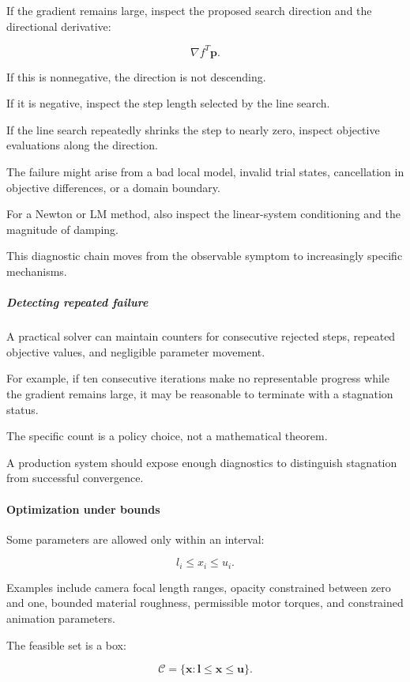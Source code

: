 If the gradient remains large, inspect the proposed search direction and the directional derivative:

\[
\nabla f^T\mathbf p.
\]

If this is nonnegative, the direction is not descending.

If it is negative, inspect the step length selected by the line search.

If the line search repeatedly shrinks the step to nearly zero, inspect objective evaluations along the direction.

The failure might arise from a bad local model, invalid trial states, cancellation in objective differences, or a domain boundary.

For a Newton or LM method, also inspect the linear-system conditioning and the magnitude of damping.

This diagnostic chain moves from the observable symptom to increasingly specific mechanisms.

\subparagraph{Detecting repeated failure}\label{detecting-repeated-failure}

A practical solver can maintain counters for consecutive rejected steps, repeated objective values, and negligible parameter movement.

For example, if ten consecutive iterations make no representable progress while the gradient remains large, it may be reasonable to terminate with a stagnation status.

The specific count is a policy choice, not a mathematical theorem.

A production system should expose enough diagnostics to distinguish stagnation from successful convergence.

\paragraph{Optimization under bounds}\label{optimization-under-bounds}

Some parameters are allowed only within an interval:

\[
l_i\le x_i\le u_i.
\]

Examples include camera focal length ranges, opacity constrained between zero and one, bounded material roughness, permissible motor torques, and constrained animation parameters.

The feasible set is a box:

\[
\mathcal C= \{\mathbf x:\mathbf l\le\mathbf x\le\mathbf u\}.
\]

